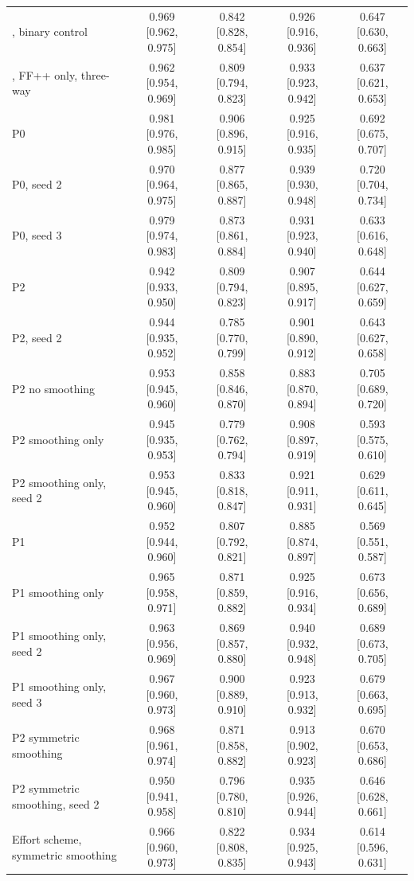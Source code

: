 \begin{tabular}{@{}l cccc@{}}
\ours{}, binary control & 0.969 [0.962, 0.975] & 0.842 [0.828, 0.854] & 0.926 [0.916, 0.936] & 0.647 [0.630, 0.663] \\
\ours{}, FF++ only, three-way & 0.962 [0.954, 0.969] & 0.809 [0.794, 0.823] & 0.933 [0.923, 0.942] & 0.637 [0.621, 0.653] \\
\quad P0 & 0.981 [0.976, 0.985] & 0.906 [0.896, 0.915] & 0.925 [0.916, 0.935] & 0.692 [0.675, 0.707] \\
\quad P0, seed 2 & 0.970 [0.964, 0.975] & 0.877 [0.865, 0.887] & 0.939 [0.930, 0.948] & 0.720 [0.704, 0.734] \\
\quad P0, seed 3 & 0.979 [0.974, 0.983] & 0.873 [0.861, 0.884] & 0.931 [0.923, 0.940] & 0.633 [0.616, 0.648] \\
\quad P2 & 0.942 [0.933, 0.950] & 0.809 [0.794, 0.823] & 0.907 [0.895, 0.917] & 0.644 [0.627, 0.659] \\
\quad P2, seed 2 & 0.944 [0.935, 0.952] & 0.785 [0.770, 0.799] & 0.901 [0.890, 0.912] & 0.643 [0.627, 0.658] \\
\quad P2 no smoothing & 0.953 [0.945, 0.960] & 0.858 [0.846, 0.870] & 0.883 [0.870, 0.894] & 0.705 [0.689, 0.720] \\
\quad P2 smoothing only & 0.945 [0.935, 0.953] & 0.779 [0.762, 0.794] & 0.908 [0.897, 0.919] & 0.593 [0.575, 0.610] \\
\quad P2 smoothing only, seed 2 & 0.953 [0.945, 0.960] & 0.833 [0.818, 0.847] & 0.921 [0.911, 0.931] & 0.629 [0.611, 0.645] \\
\quad P1 & 0.952 [0.944, 0.960] & 0.807 [0.792, 0.821] & 0.885 [0.874, 0.897] & 0.569 [0.551, 0.587] \\
\quad P1 smoothing only & 0.965 [0.958, 0.971] & 0.871 [0.859, 0.882] & 0.925 [0.916, 0.934] & 0.673 [0.656, 0.689] \\
\quad P1 smoothing only, seed 2 & 0.963 [0.956, 0.969] & 0.869 [0.857, 0.880] & 0.940 [0.932, 0.948] & 0.689 [0.673, 0.705] \\
\quad P1 smoothing only, seed 3 & 0.967 [0.960, 0.973] & 0.900 [0.889, 0.910] & 0.923 [0.913, 0.932] & 0.679 [0.663, 0.695] \\
\quad P2 symmetric smoothing & 0.968 [0.961, 0.974] & 0.871 [0.858, 0.882] & 0.913 [0.902, 0.923] & 0.670 [0.653, 0.686] \\
\quad P2 symmetric smoothing, seed 2 & 0.950 [0.941, 0.958] & 0.796 [0.780, 0.810] & 0.935 [0.926, 0.944] & 0.646 [0.628, 0.661] \\
\quad Effort scheme, symmetric smoothing & 0.966 [0.960, 0.973] & 0.822 [0.808, 0.835] & 0.934 [0.925, 0.943] & 0.614 [0.596, 0.631] \\

\end{tabular}
